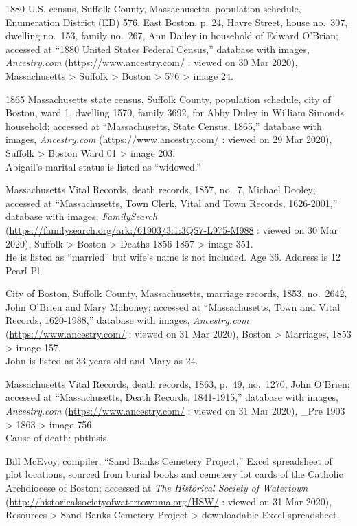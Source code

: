 \begin{thebibliography}{999}
	1880 U.S. census, Suffolk County, Massachusetts, population schedule, Enumeration District (ED) 576, East Boston, p. 24, Havre Street, house no.\ 307, dwelling no.\ 153, family no.\ 267, Ann Dailey in household of Edward O'Brian; accessed at ``1880 United States Federal Census,'' database with images, \textit{Ancestry.com} (\url{https://www.ancestry.com/} : viewed on 30 Mar 2020), Massachusetts > Suffolk > Boston > 576 > image 24.

	1865 Massachusetts state census, Suffolk County, population schedule, city of Boston, ward 1, dwelling 1570, family 3692, for Abby Duley in William Simonds household; accessed at ``Massachusetts, State Census, 1865,'' database with images, \textit{Ancestry.com} (\url{https://www.ancestry.com/} : viewed on 29 Mar 2020), Suffolk > Boston Ward 01 > image 203.\\
	Abigail's marital status is listed as ``widowed.''
	
	Massachusetts Vital Records, death records, 1857, no.\ 7, Michael Dooley; accessed at ``Massachusetts, Town Clerk, Vital and Town Records, 1626-2001,'' database with images, \textit{FamilySearch} (\url{https://familysearch.org/ark:/61903/3:1:3QS7-L975-M988} : viewed on 30 Mar 2020), Suffolk > Boston > Deaths 1856-1857 > image 351.\\
	He is listed as ``married'' but wife's name is not included. Age 36. Address is 12 Pearl Pl.
	
	City of Boston, Suffolk County, Massachusetts, marriage records, 1853, no.\ 2642, John O'Brien and Mary Mahoney; accessed at ``Massachusetts, Town and Vital Records, 1620-1988,'' database with images, \textit{Ancestry.com} (\url{https://www.ancestry.com/} : viewed on 31 Mar 2020), Boston > Marriages, 1853 > image 157.\\
	John is listed as 33 years old and Mary as 24.
	
	Massachusetts Vital Records, death records, 1863, p.\ 49, no.\ 1270, John O'Brien; accessed at ``Massachusetts, Death Records, 1841-1915,'' database with images, \textit{Ancestry.com} (\url{https://www.ancestry.com/} : viewed on 31 Mar 2020), \_Pre 1903 > 1863 > image 756.\\
	Cause of death: phthisis.
	
	Bill McEvoy, compiler, ``Sand Banks Cemetery Project,'' Excel spreadsheet of plot locations, sourced from burial books and cemetery lot cards of the Catholic Archdiocese of Boston; accessed at \textit{The Historical Society of Watertown} (\url{http://historicalsocietyofwatertownma.org/HSW/} : viewed on 31 Mar 2020), Resources > Sand Banks Cemetery Project > downloadable Excel spreadsheet.
	

\end{thebibliography}
